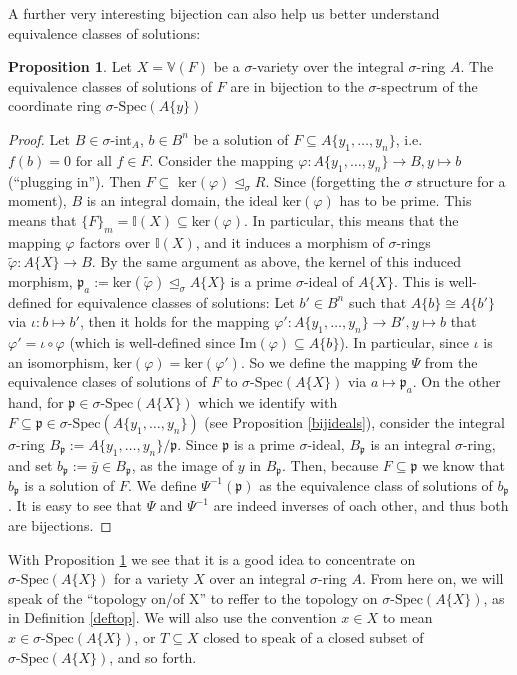 \documentclass{article}
\def\I{\mathbb{I}}
\def\VV{\mathbb{V}}
\def\p{\mathfrak{p}}
\def\s{\sigma}
\def\si{\unlhd_{\sigma}}
\def\sSpec{\sigma\text{-Spec}}
\def\fa{\text{ for all }}
\newenvironment{bew}{\begin{proof}[Proof]}{\end{proof}}
\theoremstyle{definition}
\newtheorem{prop}[Satz]{Proposition}
\begin{document}
A further very interesting bijection can also help us better understand equivalence classes of solutions: 
\begin{prop}\label{bijsols}
Let $X = \VV(F)$ be a $\s$-variety over the integral $\s$-ring $A$. The equivalence classes of solutions of $F$ are in bijection to the $\s$-spectrum of the coordinate ring $\sSpec(A\{y\})$
\begin{bew}
Let $B \in \s$-int$_A$, $b \in B^n$ be a solution of $F \subseteq A\{y_1,\ldots,y_n\}$, i.e. $f(b) = 0 \fa f \in F$. Consider the mapping $\varphi: A\{y_1,\ldots,y_n\} \rightarrow B, y \mapsto b$ (``plugging in''). Then $F \subseteq $ ker$( \varphi) \si R$.
Since (forgetting the $\s$ structure for a moment), $B$ is an integral domain, the ideal ker$(\varphi)$ has to be prime. This means that $\{F\}_m = \I(X) \subseteq $ker$(\varphi)$. 
In particular, this means that the mapping $\varphi$ factors over $\I(X)$, and it induces a morphism of $\s$-rings $\tilde \varphi: A\{X\} \rightarrow B$. By the same argument as above, the kernel of this induced
morphism, $\p_a := $ker$(\tilde \varphi) \si A\{X\}$ is a prime $\s$-ideal of $A\{X\}$. This is well-defined for equivalence classes of solutions: Let $b' \in B^n$ such that $A\{b\} \cong A\{b'\}$ via $\iota: b \mapsto b'$, 
then it holds for the mapping $\varphi': A\{y_1, \ldots, y_n\} \rightarrow B', y \mapsto b$ that $\varphi' = \iota \circ \varphi$ (which is well-defined since Im$(\varphi)\subseteq A\{b\}$). In particular, since $\iota$ is an isomorphism, ker$(\varphi) = $ker$(\varphi')$.
So we define the mapping $\Psi$ from the equivalence clases of solutions of $F$ to $\sSpec(A\{X\})$ via $a \mapsto \p_a$. On the other hand, for $\p \in \sSpec(A\{X\})$ which we identify with $F \subseteq \p \in \sSpec(A\{y_1,\ldots,y_n\})$ (see Proposition \ref{bijideals}), consider the integral $\s$-ring $B_\p:= A\{y_1,\ldots,y_n\}/\p$.
Since $\p$ is a prime $\s$-ideal, $B_\p$ is an integral $\s$-ring, and set $b_\p := \bar y \in B_\p$, as the image of $y$ in $B_\p$. Then, because $F \subseteq \p$ we know that $b_\p$ is a solution of $F$. 
We define $\Psi^{-1}(\p)$ as the equivalence class of solutions of $b_\p$. It is easy to see that $\Psi$ and $\Psi^{-1}$ are indeed inverses of oach other, and thus both are bijections.
\end{bew}
\end{prop}

With Proposition \ref{bijsols} we see that it is a good idea to concentrate on $\sSpec(A\{X\})$ for a variety $X$ over an integral $\s$-ring $A$.
 From here on, we will speak of the ``topology on/of X'' to reffer to the topology on $\sSpec(A\{X\})$, as in Definition \ref{deftop}. 
We will also use the convention $x \in X$ to mean $x \in \sSpec(A\{X\})$, or $T \subseteq X$ closed to speak of a closed subset of $\sSpec(A\{X\})$, and so forth.
\end{document}
